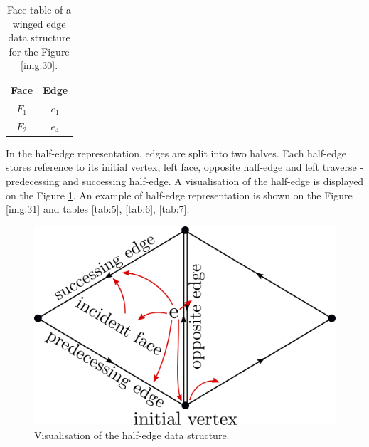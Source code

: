 \begin{table}[]
    \centering
    \begin{tabular}{|c|c|}
    \hline
    \hline
    Face  & Edge            \\ \hline\hline
    $F_1$ & $e_1$           \\ \hline
    $F_2$ & $e_4$           \\ \hline\hline
    \end{tabular}
\caption{Face table of a winged edge data structure for the Figure \ref{img:30}.}
\label{tab:4}
\end{table}

In the half-edge representation, edges are split into two halves. Each half-edge
stores reference to its initial vertex, left face, opposite half-edge and left
traverse - predecessing and successing half-edge. A visualisation of the
half-edge is displayed on the Figure \ref{img:32}. An example of half-edge
representation is shown on the Figure \ref{img:31} and tables 
\ref{tab:5}, \ref{tab:6}, \ref{tab:7}.

\begin{figure}
    \centerline{\includegraphics[scale=0.5]{images/img32}}
    \caption[Visualisation of the half-edge data structure]
    {Visualisation of the half-edge data structure.}
    \label{img:32}
\end{figure}


